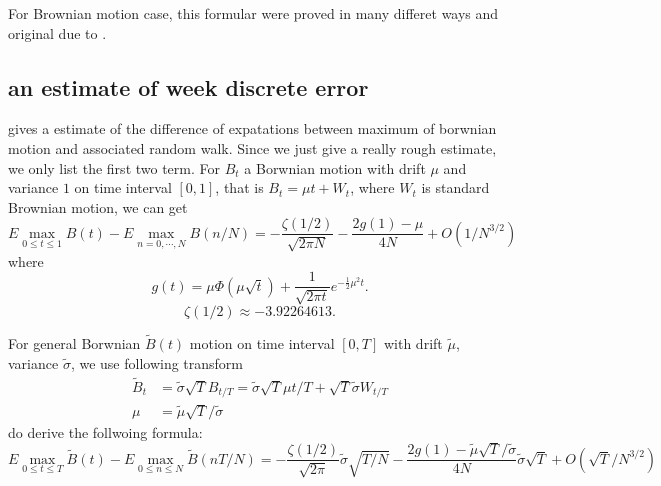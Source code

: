 \documentclass[11pt]{book}
\def\tB{{\widetilde{B}}}
\def\tmu{{\widetilde{\mu}}}
\def\tsigma{{\widetilde{\sigma}}}
\begin{document}
For Brownian motion case, this formular were proved in many differet ways
and original due to \cite{Dassios1995}.

\subsection{an estimate of week discrete error}
\cite{Janssen2008} gives a estimate of the difference of  expatations
between maximum of borwnian motion and associated random walk.
Since we just give a really rough estimate, we only list the first two term.
For $B_t$ a Borwnian motion with drift $\mu$ and variance $1$ on time interval $[0,1]$, that is $B_t = \mu t + W_t$, where $W_t$ is standard Brownian motion, we can get
\begin{equation}\label{eq:est1}
E\max_{0\leq t \leq 1} B(t) - E\max_{n=0,\cdots, N}B(n/N)
= -\frac{\zeta(1/2)}{\sqrt{2\pi N}}-\frac{2g(1)-\mu}{4N} + O(1/N^{3/2})
\end{equation}
where
\[
g(t) = \mu \Phi(\mu \sqrt{t}) + \frac{1}{\sqrt{2\pi t}} e^{-\frac{1}{2}\mu^2 t}.
\]
\[
\zeta(1/2) \approx -3.92264613.
\]

For general Borwnian $\tB(t)$ motion on time interval $[0,T]$ with drift $\tmu$, variance $\tsigma$,
we use following transform
\begin{align*}
\tB_t &= \tsigma \sqrt{T} B_{t/T} = \tsigma \sqrt{T} \mu t/T
+ \sqrt{T}\tsigma W_{t/T}\\
\mu &= \tmu \sqrt{T}/\tsigma
\end{align*}
do derive the follwoing formula:
\begin{equation}\label{eq:maxest}
E\max_{0\leq t\leq T} \tB(t) - E \max_{0\leq n \leq N} \tB(nT/N) =
 -\frac{\zeta(1/2)}{\sqrt{2\pi}}\tsigma \sqrt{T/N}
 -\frac{2g(1)-\tmu\sqrt{T} / \tsigma}{4N}\tsigma\sqrt{T} +
O(\sqrt{T}/N^{3/2})
\end{equation}
\end{document}
